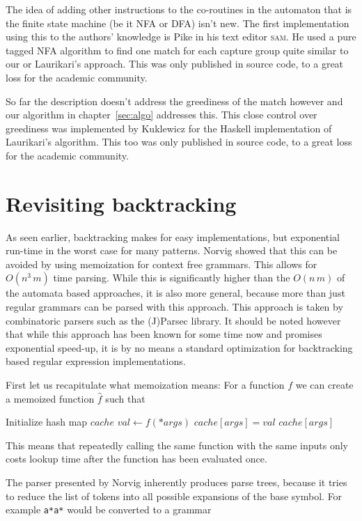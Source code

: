 \documentclass[11pt,a4paper,twoside,openright]{Thesis}
\theoremstyle{definition}
\newcommand{\seclabel}[1]{\label{sec:#1}}
\begin{document}
The idea of adding other instructions to the co-routines in the automaton 
that is the finite state machine (be it NFA or DFA) isn't new. The first 
implementation using this to the authors' knowledge is Pike\cite{Pike87a} in 
his text editor \textsc{sam}. He used a pure tagged NFA algorithm to find one 
match for each capture group quite similar to our or Laurikari's approach. This
was only published in source code, to a great loss for the academic community.

So far the description doesn't address the greediness of the match however and
our algorithm in chapter~\ref{sec:algo} addresses this. This close control
over greediness was implemented by Kuklewicz\cite{Kukl07a} for the Haskell
implementation of Laurikari's algorithm. This too was only published in source
code, to a great loss for the academic community.

\section{Revisiting backtracking}\seclabel{revise-backtrack}
As seen earlier, backtracking makes for easy implementations, but exponential 
run-time in the worst case for many patterns. Norvig\cite{Norv91a} showed that
this can be avoided by using memoization for context free grammars.  This
allows for $O(n^3\, m)$ time parsing. While this is significantly higher than
the $O(n\, m)$ of the automata based approaches, it is also more general,
because more than just regular grammars can be parsed with this approach.  This
approach is taken by combinatoric parsers such as the (J)Parsec library.  It
should be noted however that while this approach has been known for some time
now and promises exponential speed-up, it is by no means a standard
optimization for backtracking based regular expression implementations.

First let us recapitulate what memoization means: For a function $f$ we can 
create a memoized function $\hat f$ such that
\begin{algorithmic}
  \State Initialize hash map $cache$
  \State $val\leftarrow f(*args)$
  \State $cache[args] = val$
  \EndIf
  \State \Return $cache[args]$
  \EndFunction
\end{algorithmic}
This means that repeatedly calling the same function with  the same inputs 
only costs lookup time after the function has been evaluated once.

The parser presented by Norvig inherently produces parse trees, because it 
tries to reduce the list of tokens into all possible expansions of the base
symbol. For example \texttt{a*a*} would be converted to a grammar
\end{document}
